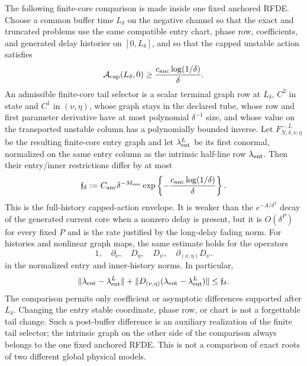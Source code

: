 \begin{theorem}
The following finite-core comparison is made inside one fixed anchored
RFDE.  Choose a common buffer time \(L_\delta\) on the negative channel so
that the exact and truncated problems use the same compatible entry chart,
phase row, coefficients, and generated delay histories on
\([0,L_\delta]\), and so that the capped unstable action satisfies
\begin{equation}
 \mathcal A_{\rm cap}(L_\delta,0)\ge
 \frac{c_{\rm anc}\log(1/\delta)}{\delta}.       \label{eq:anchor-comparison-buffer-action}
\end{equation}
An admissible finite-core tail selector is a scalar terminal graph row at
\(L_\delta\), \(C^2\) in state and \(C^1\) in \((\nu,\eta)\), whose graph
stays in the declared tube, whose row and first parameter derivative have
at most polynomial \(\delta^{-1}\) size, and whose value on the transported
unstable column has a polynomially bounded inverse.  Let
\(F^{-,L}_{N,\delta,\nu,\eta}\) be the resulting finite-core entry graph and
let \(\lambda^{L}_{\rm ent}\) be its first conormal, normalized on the
same entry column as the intrinsic half-line row
\(\lambda_{\rm ent}\).  Then their entry/inner restrictions differ by at
most
\begin{equation}
 \mathfrak f_\delta
 :=C_{\rm anc}\delta^{-M_{\rm anc}}
       \exp\left\{-\frac{c_{\rm anc}\log(1/\delta)}{\delta}\right\}.
                                                               \label{eq:anchor-flat-envelope}
\end{equation}
This is the full-history capped-action envelope.  It is weaker than the
\(e^{-A/\delta^2}\) decay of the generated current core when a nonzero
delay is present, but it is \(O(\delta^P)\) for every fixed \(P\) and is
the rate justified by the long-delay fading norm.
For histories and nonlinear graph maps, the same estimate holds for the
operators
\begin{equation}
 1,\quad \partial_\nu,\quad D_\eta,\quad D_\psi,\quad
 \partial_{(\nu,\eta)}D_\psi.                       \label{eq:anchor-flat-jet-list}
\end{equation}
in the normalized entry and inner-history norms.  In particular,
\begin{equation}
 \|\lambda_{\rm ent}-\lambda^{L}_{\rm ent}\|
 +\|D_{(\nu,\eta)}
       (\lambda_{\rm ent}-\lambda^{L}_{\rm ent})\|
 \le \mathfrak f_\delta .                           \label{eq:anchor-flat-conormal-comparison}
\end{equation}
The comparison permits only coefficient or asymptotic differences supported
after \(L_\delta\).  Changing the entry stable coordinate, phase row, or
chart is not a forgettable tail change.  Such a post-buffer difference is
an auxiliary realization of the finite tail selector; the intrinsic graph
on the other side of the comparison always belongs to the one fixed
anchored RFDE.  This is not a comparison of exact roots of two different
global physical models.


\end{theorem}
